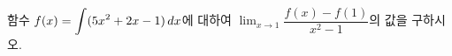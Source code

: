 함수 $f(x)=\displaystyle\int (5x^2+2x-1)\mkern3mu dx$에 대하여 $\displaystyle\lim_{x\to 1}\dfrac{f(x)-f(1)}{x^2-1}$의 값을 구하시오.
